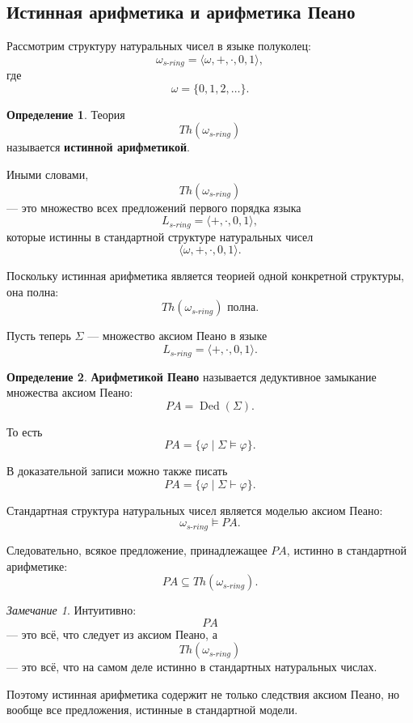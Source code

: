 \documentclass[12pt,a4paper,oneside,openany]{book}
\theoremstyle{definition}
\newtheorem{definition}{Определение}[chapter]
\theoremstyle{plain}
\theoremstyle{remark}
\newtheorem{remark}{Замечание}[chapter]
\begin{document}
\subsection{Истинная арифметика и арифметика Пеано}

Рассмотрим структуру натуральных чисел в языке полуколец:
\[
\omega_{s\text{-}ring}
=
\langle\omega,+,\cdot,0,1\rangle,
\]
где
\[
\omega=\{0,1,2,\ldots\}.
\]

\begin{definition}
Теория
\[
Th(\omega_{s\text{-}ring})
\]
называется \textbf{истинной арифметикой}.
\end{definition}

Иными словами,
\[
Th(\omega_{s\text{-}ring})
\]
— это множество всех предложений первого порядка языка
\[
L_{s\text{-}ring}
=
\langle +,\cdot,0,1\rangle,
\]
которые истинны в стандартной структуре натуральных чисел
\[
\langle\omega,+,\cdot,0,1\rangle.
\]

Поскольку истинная арифметика является теорией одной конкретной структуры, она полна:
\[
Th(\omega_{s\text{-}ring})
\text{ полна}.
\]

Пусть теперь $\Sigma$ — множество аксиом Пеано в языке
\[
L_{s\text{-}ring}
=
\langle +,\cdot,0,1\rangle.
\]

\begin{definition}
\textbf{Арифметикой Пеано} называется дедуктивное замыкание множества аксиом Пеано:
\[
PA=\operatorname{Ded}(\Sigma).
\]
\end{definition}

То есть
\[
PA
=
\{\varphi\mid \Sigma\models\varphi\}.
\]

В доказательной записи можно также писать
\[
PA
=
\{\varphi\mid \Sigma\vdash\varphi\}.
\]

Стандартная структура натуральных чисел является моделью аксиом Пеано:
\[
\omega_{s\text{-}ring}\models PA.
\]

Следовательно, всякое предложение, принадлежащее $PA$, истинно в стандартной арифметике:
\[
PA\subseteq Th(\omega_{s\text{-}ring}).
\]

\begin{remark}
Интуитивно:
\[
PA
\]
— это всё, что следует из аксиом Пеано, а
\[
Th(\omega_{s\text{-}ring})
\]
— это всё, что на самом деле истинно в стандартных натуральных числах.

Поэтому истинная арифметика содержит не только следствия аксиом Пеано, но вообще все предложения, истинные в стандартной модели.
\end{remark}
\end{document}
